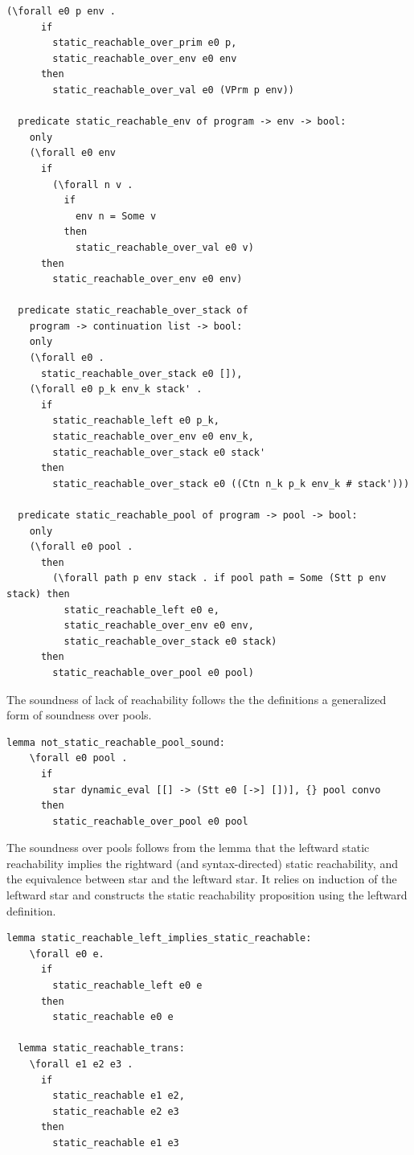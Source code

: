 \documentclass{article}
\begin{document}
\begin{lstlisting}[language=logic, mathescape]
    (\forall e0 p env .
      if
        static_reachable_over_prim e0 p, 
        static_reachable_over_env e0 env
      then
        static_reachable_over_val e0 (VPrm p env))

  predicate static_reachable_env of program -> env -> bool:
    only
    (\forall e0 env
      if
        (\forall n v .
          if
            env n = Some v
          then
            static_reachable_over_val e0 v)
      then
        static_reachable_over_env e0 env)

  predicate static_reachable_over_stack of
    program -> continuation list -> bool:
    only
    (\forall e0 .
      static_reachable_over_stack e0 []),
    (\forall e0 p_k env_k stack' .
      if
        static_reachable_left e0 p_k, 
        static_reachable_over_env e0 env_k,
        static_reachable_over_stack e0 stack' 
      then
        static_reachable_over_stack e0 ((Ctn n_k p_k env_k # stack')))

  predicate static_reachable_pool of program -> pool -> bool:
    only
    (\forall e0 pool .
      then
        (\forall path p env stack . if pool path = Some (Stt p env stack) then 
          static_reachable_left e0 e, 
          static_reachable_over_env e0 env, 
          static_reachable_over_stack e0 stack)
      then
        static_reachable_over_pool e0 pool)

  \end{lstlisting}

The soundness of lack of reachability follows the the definitions
a generalized form of soundness over pools.

\begin{lstlisting}[language=logic, mathescape]
  lemma not_static_reachable_pool_sound:
    \forall e0 pool .
      if
        star dynamic_eval [[] -> (Stt e0 [->] [])], {} pool convo 
      then
        static_reachable_over_pool e0 pool

  \end{lstlisting}


The soundness over pools follows from the lemma that the leftward
static reachability implies the rightward (and syntax-directed) static reachability,
and the equivalence between star and the leftward star.  It relies on induction of the
leftward star and constructs the static reachability
proposition using the leftward definition.  

\begin{lstlisting}[language=logic, mathescape]
  lemma static_reachable_left_implies_static_reachable:
    \forall e0 e. 
      if
        static_reachable_left e0 e
      then
        static_reachable e0 e

  lemma static_reachable_trans:
    \forall e1 e2 e3 .
      if 
        static_reachable e1 e2,
        static_reachable e2 e3
      then
        static_reachable e1 e3
  \end{lstlisting}
\end{document}
